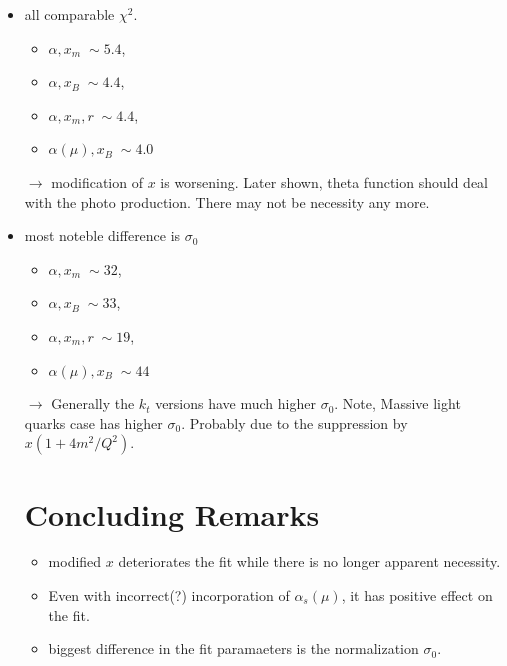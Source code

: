 \documentclass[12pt]{article}
\begin{document}
\begin{itemize}
\item all comparable $\chi^2 $. 
\begin{itemize}
\item $\alpha, x_m\;\sim5.4$, 
\item $\alpha, x_B\;\sim4.4$,
\item $\alpha, x_m, r\;\sim4.4$, 
\item $\alpha(\mu), x_B\;\sim4.0$
\end{itemize}
$\rightarrow$ modification of $x$ is worsening.
Later shown, theta function should deal with the photo production. There may not be necessity any more.\\
\item most noteble difference is $\sigma_0$
\begin{itemize}
\item $\alpha, x_m\;\sim32$, 
\item $\alpha, x_B\;\sim33$,
\item $\alpha, x_m, r\;\sim19$, 
\item $\alpha(\mu), x_B\;\sim44$
\end{itemize}
$\rightarrow$ Generally the $k_t$ versions have much higher $\sigma_0$.
Note, Massive light quarks case has higher $\sigma_0$. Probably due  to the suppression by $x(1+4m^2/Q^2)$.

\section{Concluding Remarks}
\begin{itemize}
\item modified $x$ deteriorates the fit while there is no longer apparent necessity.
\item Even with incorrect(?) incorporation of $\alpha_s(\mu)$, it has positive effect on the fit. 
\item biggest difference in the fit paramaeters is the normalization $\sigma_0$. 
\end{itemize}
\end{itemize}
\end{document}
